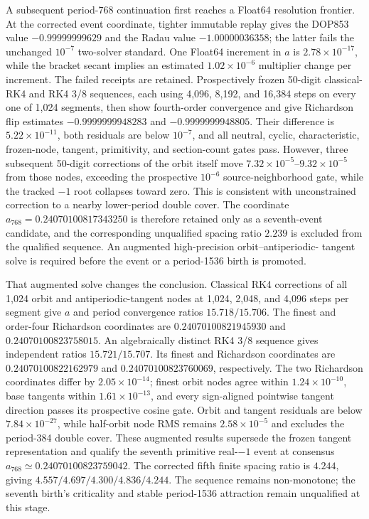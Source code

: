 A subsequent period-768 continuation first reaches a Float64 resolution
frontier. At the corrected event coordinate, tighter immutable replay gives
the DOP853 value $-0.99999999629$ and the Radau value $-1.00000036358$;
the latter fails the unchanged $10^{-7}$ two-solver standard. One Float64 increment in $a$ is
$2.78\times10^{-17}$, while the bracket secant implies an estimated
$1.02\times10^{-6}$ multiplier change per increment. The failed receipts are
retained. Prospectively frozen 50-digit classical-RK4 and RK4 3/8 sequences,
each using 4,096, 8,192, and 16,384 steps on every one of 1,024 segments, then
show fourth-order convergence and give Richardson flip estimates
$-0.9999999948283$ and $-0.9999999948805$. Their difference is
$5.22\times10^{-11}$, both residuals are below $10^{-7}$, and all neutral,
cyclic, characteristic, frozen-node, tangent, primitivity, and section-count
gates pass. However, three subsequent 50-digit corrections of the orbit itself
move $7.32\times10^{-5}$--$9.32\times10^{-5}$ from those nodes, exceeding the
prospective $10^{-6}$ source-neighborhood gate, while the tracked $-1$ root
collapses toward zero. This is consistent with unconstrained correction to a
nearby lower-period double cover. The coordinate
$a_{768}=0.24070100817343250$ is therefore retained only as a seventh-event
candidate, and the corresponding unqualified spacing ratio $2.239$ is excluded
from the qualified sequence. An augmented high-precision orbit--antiperiodic-
tangent solve is required before the event or a period-1536 birth is promoted.

That augmented solve changes the conclusion. Classical RK4 corrections of all
1,024 orbit and antiperiodic-tangent nodes at 1,024, 2,048, and 4,096 steps per
segment give $a$ and period convergence ratios $15.718/15.706$. The finest and
order-four Richardson coordinates are $0.24070100821945930$ and
$0.24070100823758015$. An algebraically distinct RK4 3/8 sequence gives
independent ratios $15.721/15.707$. Its finest and Richardson coordinates are
$0.24070100822162979$ and $0.24070100823760069$, respectively. The two
Richardson coordinates differ by
$2.05\times10^{-14}$; finest orbit nodes agree within $1.24\times10^{-10}$,
base tangents within $1.61\times10^{-13}$, and every sign-aligned pointwise
tangent direction passes its prospective cosine gate. Orbit and tangent
residuals are below $7.84\times10^{-27}$, while half-orbit node RMS remains
$2.58\times10^{-5}$ and excludes the period-384 double cover. These augmented
results supersede the frozen tangent representation and qualify the seventh
primitive real-$-1$ event at consensus
$a_{768}\simeq0.24070100823759042$. The corrected fifth finite spacing ratio is
$4.244$, giving $4.557/4.697/4.300/4.836/4.244$. The sequence remains
non-monotone; the seventh birth's criticality and stable period-1536 attraction
remain unqualified at this stage.

